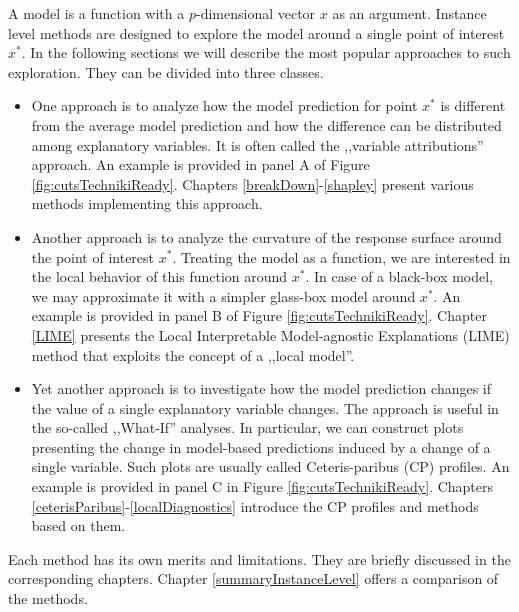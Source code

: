 \documentclass[]{krantz}
\providecommand{\tightlist}{%
  \setlength{\itemsep}{0pt}\setlength{\parskip}{0pt}}
\begin{document}
A model is a function with a \(p\)-dimensional vector \(x\) as an argument. Instance level methods are designed to explore the model around a single point of interest \(x^*\). In the following sections we will describe the most popular approaches to such exploration. They can be divided into three classes.

\begin{itemize}
\tightlist
\item
  One approach is to analyze how the model prediction for point \(x^*\) is different from the average model prediction and how the difference can be distributed among explanatory variables. It is often called the ,,variable attributions'' approach. An example is provided in panel A of Figure \ref{fig:cutsTechnikiReady}. Chapters \ref{breakDown}-\ref{shapley} present various methods implementing this approach.
\item
  Another approach is to analyze the curvature of the response surface around the point of interest \(x^*\). Treating the model as a function, we are interested in the local behavior of this function around \(x^*\). In case of a black-box model, we may approximate it with a simpler glass-box model around \(x^*\). An example is provided in panel B of Figure \ref{fig:cutsTechnikiReady}. Chapter \ref{LIME} presents the Local Interpretable Model-agnostic Explanations (LIME) method that exploits the concept of a ,,local model''.
\item
  Yet another approach is to investigate how the model prediction changes if the value of a single explanatory variable changes. The approach is useful in the so-called ,,What-If'' analyses. In particular, we can construct plots presenting the change in model-based predictions induced by a change of a single variable. Such plots are usually called Ceteris-paribus (CP) profiles. An example is provided in panel C in Figure \ref{fig:cutsTechnikiReady}. Chapters \ref{ceterisParibus}-\ref{localDiagnostics} introduce the CP profiles and methods based on them.
\end{itemize}

Each method has its own merits and limitations. They are briefly discussed in the corresponding chapters. Chapter \ref{summaryInstanceLevel} offers a comparison of the methods.
\end{document}
